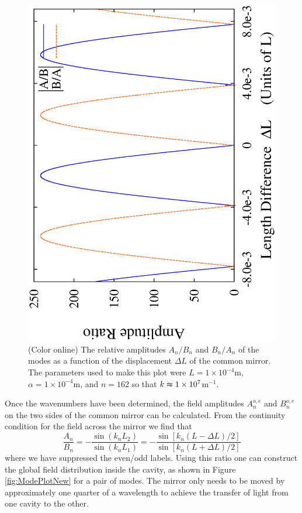 \documentclass[twocolumn,english,pra,aps,superscriptaddress,floatfix]{revtex4-1}
\begin{document}
\begin{figure}
\includegraphics[width=0.9\columnwidth]{AmplitudeRatio}
\caption{(Color online) The relative amplitudes $A_{n}/B_{n}$
and $B_{n}/A_{n}$ of the modes as a function of the displacement $\Delta L$ of the common mirror. The parameters used to make this plot were $L=1 \times 10^{-4}$m,  $\alpha=1 \times 10^{-4}$m,  and $n=162$ so that $k\thickapprox 1 \times 10^7$m$^{-1}$.}
\label{fig:AoverB}
\end{figure}


Once the wavenumbers have been determined, the field amplitudes $A_{n}^{o,e}$ and $B_{n}^{o,e}$ on the two sides of the common mirror can be calculated.  From the continuity condition for the field across the mirror we find that   
\begin{equation}
\frac{A_{n}}{B_{n}}=-\frac{\sin(k_{n}L_{2})}{\sin(k_{n}L_{1})} = -\frac{\sin [k_{n} (L-\Delta L)/2]}{\sin[k_{n}(L+\Delta L)/2]} \label{A/B} 
\end{equation}
where we have suppressed the even/odd labels.
Using this ratio one can construct the global field distribution inside the cavity, as shown in Figure \ref{fig:ModePlotNew} for a pair of modes. The mirror only needs to be moved by approximately one quarter of a wavelength to achieve the transfer of light from one cavity to the other. 
\end{document}
